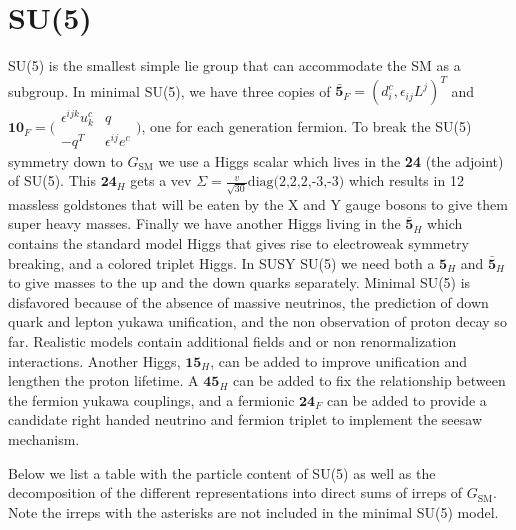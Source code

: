 \documentclass[aps,onecolumn,twoside,secnumarabic,balancelastpage,amsmath,amssymb,nofootinbib,hyperref=pdftex]{revtex4}
\begin{document}
\title{}
\author         {Noah Steinberg}
\date{\today}

\maketitle
\section{SU(5)}
SU(5) is the smallest simple lie group that can accommodate the SM as a subgroup. In minimal SU(5), we have three copies of $\bar{\textbf{5}}_{F} = (d^{c}_{i}, \epsilon_{ij}L^{j})^{T}$ and $\textbf{10}_{F} = \bigl( \begin{smallmatrix}\epsilon^{ijk}u^{c}_{k} & q\\ -q^{T} & \epsilon^{ij}e^{c}\end{smallmatrix}\bigr)$, one for each generation fermion. To break the SU(5) symmetry down to $G_{\text{SM}}$ we use a Higgs scalar which lives in the \textbf{24} (the adjoint) of SU(5). This $\textbf{24}_{H}$ gets a vev $\Sigma = \frac{v}{\sqrt{30}}\text{diag(2,2,2,-3,-3)}$ which results in 12 massless goldstones that will be eaten by the X and Y gauge bosons to give them super heavy masses. Finally we have another Higgs living in the $\bar{\textbf{5}}_{H}$ which contains the standard model Higgs that gives rise to electroweak symmetry breaking, and a colored triplet Higgs. In SUSY SU(5) we need both a $\textbf{5}_{H}$ and $\bar{\textbf{5}}_{H}$ to give masses to the up and the down quarks separately. 
Minimal SU(5) is disfavored because of the absence of massive neutrinos, the prediction of down quark and lepton yukawa unification, and the non observation of proton decay so far. Realistic models contain additional fields and or non renormalization interactions. Another Higgs, $\textbf{15}_{H}$, can be added to improve unification and lengthen the proton lifetime. A $\textbf{45}_{H}$ can be added to fix the relationship between the fermion yukawa couplings, and a fermionic $\textbf{24}_{F}$ can be added to provide a candidate right handed neutrino and fermion triplet to implement the seesaw mechanism. 

Below we list a table with the particle content of SU(5) as well as the decomposition of the different representations into direct sums of irreps of $G_{\text{SM}}$. Note the irreps with the asterisks are not included in the minimal SU(5) model. 
\end{document}

